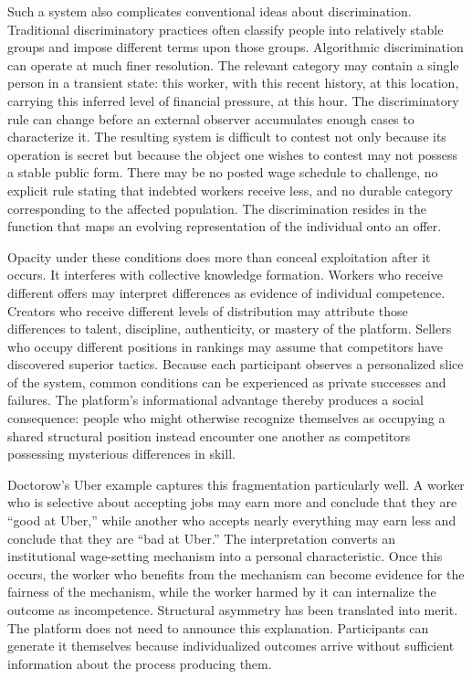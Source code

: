 \documentclass[11pt]{article}
\begin{document}
Such a system also complicates conventional ideas about discrimination. Traditional discriminatory practices often classify people into relatively stable groups and impose different terms upon those groups. Algorithmic discrimination can operate at much finer resolution. The relevant category may contain a single person in a transient state: this worker, with this recent history, at this location, carrying this inferred level of financial pressure, at this hour. The discriminatory rule can change before an external observer accumulates enough cases to characterize it. The resulting system is difficult to contest not only because its operation is secret but because the object one wishes to contest may not possess a stable public form. There may be no posted wage schedule to challenge, no explicit rule stating that indebted workers receive less, and no durable category corresponding to the affected population. The discrimination resides in the function that maps an evolving representation of the individual onto an offer.

Opacity under these conditions does more than conceal exploitation after it occurs. It interferes with collective knowledge formation. Workers who receive different offers may interpret differences as evidence of individual competence. Creators who receive different levels of distribution may attribute those differences to talent, discipline, authenticity, or mastery of the platform. Sellers who occupy different positions in rankings may assume that competitors have discovered superior tactics. Because each participant observes a personalized slice of the system, common conditions can be experienced as private successes and failures. The platform's informational advantage thereby produces a social consequence: people who might otherwise recognize themselves as occupying a shared structural position instead encounter one another as competitors possessing mysterious differences in skill.

Doctorow's Uber example captures this fragmentation particularly well. A worker who is selective about accepting jobs may earn more and conclude that they are ``good at Uber,'' while another who accepts nearly everything may earn less and conclude that they are ``bad at Uber.'' The interpretation converts an institutional wage-setting mechanism into a personal characteristic. Once this occurs, the worker who benefits from the mechanism can become evidence for the fairness of the mechanism, while the worker harmed by it can internalize the outcome as incompetence. Structural asymmetry has been translated into merit. The platform does not need to announce this explanation. Participants can generate it themselves because individualized outcomes arrive without sufficient information about the process producing them.
\end{document}
